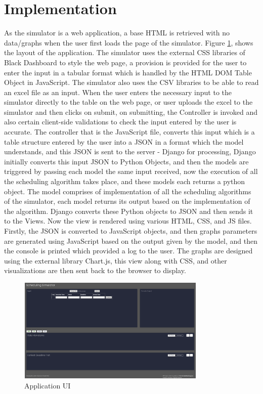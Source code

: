 \documentclass[12pt, conference]{IEEEtran}
\begin{document}
\section{Implementation}
As the simulator is a web application, a base HTML is retrieved with no data/graphs when the user first loads the page of the simulator. Figure \ref{layout}, shows the layout of the application. The simulator uses the external CSS libraries of Black Dashboard\cite{b4} to style the web page, a provision is provided for the user to enter the input in a tabular format which is handled by the HTML DOM Table Object in JavaScript. The simulator also uses the CSV libraries to be able to read an excel file as an input. When the user enters the necessary input to the simulator directly to the table on the web page, or user uploads the excel to the simulator and then clicks on submit, on submitting, the Controller is invoked and also certain client-side validations to check the input entered by the user is accurate. The controller that is the JavaScript file, converts this input which is a table structure entered by the user into a JSON in a format which the model understands, and this JSON is sent to the server - Django for processing, Django initially converts this input JSON to Python Objects, and then the models are triggered by passing each model the same input received, now the execution of all the scheduling algorithm takes place, and these models each returns a python object. The model comprises of implementation of all the scheduling algorithms of the simulator, each model returns its output based on the implementation of the algorithm. Django converts these Python objects to JSON and then sends it to the Views. Now the view is rendered using various HTML, CSS, and JS files. Firstly, the JSON is converted to JavaScript objects, and then graphs parameters are generated using JavaScript based on the output given by the model, and then the console is printed which provided a log to the user.  The graphs are designed using the external library Chart.js\cite{b3}, this view along with CSS, and other visualizations are then sent back to the browser to display. \\
\begin{figure}
\centerline{\includegraphics[width=9cm, height=5cm]{layout.png}}
\caption{Application UI}
\label{layout}
\end{figure} 
\end{document}
